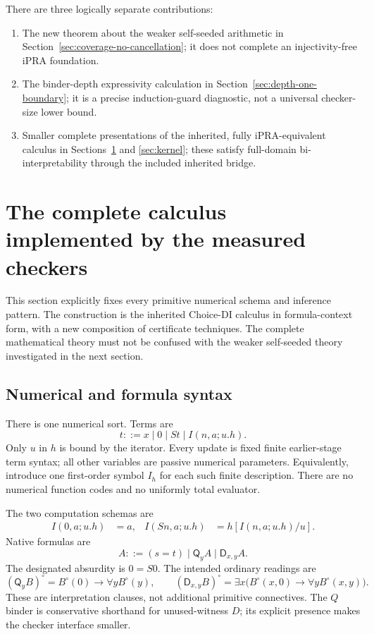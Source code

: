 \documentclass[11pt]{article}
\theoremstyle{definition}\newtheorem{definition}[theorem]{Definition}
\newcommand{\Q}{\mathsf Q}
\newcommand{\D}{\mathsf D}
\begin{document}
There are three logically separate contributions:
\begin{enumerate}
\item The new theorem about the weaker self-seeded arithmetic in
Section~\ref{sec:coverage-no-cancellation}; it does not complete an
injectivity-free iPRA foundation.
\item The binder-depth expressivity calculation in
Section~\ref{sec:depth-one-boundary}; it is a precise induction-guard
diagnostic, not a universal checker-size lower bound.
\item Smaller complete presentations of the inherited, fully
iPRA-equivalent calculus in Sections~\ref{sec:axioms} and
\ref{sec:kernel}; these satisfy full-domain bi-interpretability through
the included inherited bridge.
\end{enumerate}

\section{The complete calculus implemented by the measured checkers}
\label{sec:axioms}
This section explicitly fixes every primitive numerical schema and
inference pattern. The construction is the inherited Choice-DI calculus
in formula-context form, with a new composition of certificate techniques.
The complete mathematical theory must not be confused with the weaker
self-seeded theory investigated in the next section.

\subsection{Numerical and formula syntax}
There is one numerical sort. Terms are
\[
 t::=x\mid0\mid St\mid I(n,a;u.h).
\]
Only $u$ in $h$ is bound by the iterator. Every update is fixed finite
earlier-stage term syntax; all other variables are passive numerical
parameters. Equivalently, introduce one first-order symbol $I_h$ for
each such finite description. There are no numerical function codes
and no uniformly total evaluator.

The two computation schemas are
\begin{align}
 I(0,a;u.h)&=a, & I(Sn,a;u.h)&=h[I(n,a;u.h)/u].
 \tag{I0, IS}\label{eq:choice-computations}
\end{align}
Native formulas are
\[
 A::=(s=t)\mid\Q_y A\mid\D_{x,y}A.
\]
The designated absurdity is $0=S0$. The intended ordinary readings are
\[
 (\Q_yB)^\circ=B^\circ(0)\to\forall yB^\circ(y),\qquad
 (\D_{x,y}B)^\circ=
 \exists x\bigl(B^\circ(x,0)\to\forall yB^\circ(x,y)\bigr).
\]
These are interpretation clauses, not additional primitive connectives.
The $Q$ binder is conservative shorthand for unused-witness $D$;
its explicit presence makes the checker interface smaller.
\end{document}
